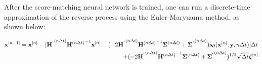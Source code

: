 \documentclass[12pt,]{article}
\begin{document}



After the score-matching neural network is trained, one can run a discrete-time approximation of the reverse process using the Euler-Maryuama method, as shown below:

\begin{gather}
     \mathbf{x}^{[n-1]} = \mathbf{x}^{[n]} - [\mathbf{H^{'}}^{(n\Delta t)}{\mathbf{H}^{(n \Delta t)}}^{\hspace{0mm}-1} \mathbf{x}^{[n]} - (-  2 {\mathbf{H^{'}}^{(n \Delta t)}} {\mathbf{H}^{(n \Delta t)}}^{\hspace{0mm}-1}  \boldsymbol{\Sigma}^{(n \Delta t)} + \boldsymbol{\Sigma^{'}}^{(n \Delta t)} )  \mathbf{s}_{\boldsymbol{\theta}}(\mathbf{x}^{[n]}, \mathbf{y}, n\Delta t)] \Delta t \nonumber \\
    \hspace{70mm} + (-  2 {\mathbf{H^{'}}^{(n \Delta t)}} {\mathbf{H}^{(n\Delta t)}}^{\hspace{0mm}-1}  \boldsymbol{\Sigma}^{(n \Delta t)} + \boldsymbol{\Sigma^{'}}^{(n\Delta t)}  )^{1/2} \sqrt{\Delta t} \boldsymbol{\zeta}^{[n]} \label{eq:euler-maryuama}
\end{gather}
\end{document}
